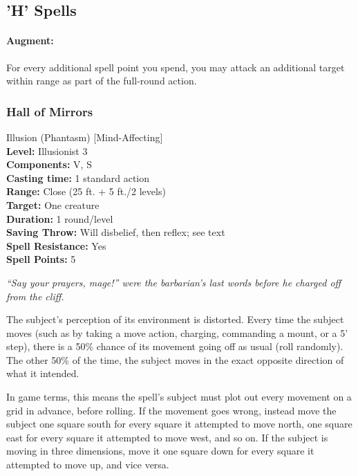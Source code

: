 \subsection{'H' Spells}

\paragraph{Augment:} For every additional spell point you spend, you may attack an additional target within range as part of the full-round action.
\subsubsection{Hall of Mirrors}
\label{Spell:HallOfMirrors}
Illusion (Phantasm) [Mind-Affecting]
\\ \textbf{Level:} Illusionist 3
\\ \textbf{Components:} V, S
\\ \textbf{Casting time:} 1 standard action
\\ \textbf{Range:} Close (25 ft. + 5 ft./2 levels)
\\ \textbf{Target:} One creature
\\ \textbf{Duration:} 1 round/level
\\ \textbf{Saving Throw:} Will disbelief, then reflex; see text
\\ \textbf{Spell Resistance:} Yes
\\ \textbf{Spell Points:} 5

\emph{``Say your prayers, mage!'' were the barbarian's last words before he charged off from the cliff.}

The subject's perception of its environment is distorted.
Every time the subject moves (such as by taking a move action, charging, commanding a mount, or a 5' step), 
there is a 50\% chance of its movement going off as usual (roll randomly). The other 50\% of the time, the
subject moves in the exact opposite direction of what it intended.

In game terms, this means the spell's subject must plot out every movement on a grid in advance, before rolling.
If the movement goes wrong, instead move the subject one square south for every square it attempted to move north,
one square east for every square it attempted to move west, and so on. If the subject is moving in three dimensions, 
move it one square down for every square it attempted to move up, and vice versa.

